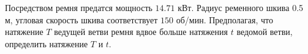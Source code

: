 Посредством ремня предатся мощность $14.71$ кВт. Радиус ременного шкива
0.5 м, угловая скорость шкива соответствует $150$ об/мин. Предполагая,
что натяжение $T$ ведущей ветви ремня вдвое больше натяжения $t$ ведомой
ветви, определить натяжение $T$ и $t$.
